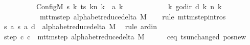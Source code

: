 \begin{isabellebody}
\ \ \ \ \ \ \ \ \ \ Config\isactrlsub M\ {\isacharquery}{\kern0pt}s{\isacharprime}{\kern0pt}\ {\isacharparenleft}{\kern0pt}{\isasymlambda}k{\isachardot}{\kern0pt}\ {\isacharparenleft}{\kern0pt}ts\ k{\isacharparenright}{\kern0pt}{\isacharparenleft}{\kern0pt}n\ k\ {\isacharcolon}{\kern0pt}{\isacharequal}{\kern0pt}\ {\isacharquery}{\kern0pt}a\ k{\isacharparenright}{\kern0pt}{\isacharparenright}{\kern0pt}\isanewline
\ \ \ \ \ \ \ \ \ \ \ \ {\isacharparenleft}{\kern0pt}{\isasymlambda}k{\isachardot}{\kern0pt}\ go{\isacharunderscore}{\kern0pt}dir\ {\isacharparenleft}{\kern0pt}{\isacharquery}{\kern0pt}d\ k{\isacharparenright}{\kern0pt}\ {\isacharparenleft}{\kern0pt}n\ k{\isacharparenright}{\kern0pt}{\isacharparenright}{\kern0pt}{\isacharparenright}{\kern0pt}\isanewline
\ \ \ \ \ \ \ \ \ \ {\isasymin}\ mttm{\isacharunderscore}{\kern0pt}step\ {\isacharparenleft}{\kern0pt}alphabet{\isacharunderscore}{\kern0pt}reduce{\isacharunderscore}{\kern0pt}delta\ M{\isacharparenright}{\kern0pt}{\isachardoublequoteclose}\isanewline
\ \ \isamarkupfalse%
\ {\isacharparenleft}{\kern0pt}rule\ mttm{\isacharunderscore}{\kern0pt}step{\isachardot}{\kern0pt}intros{\isacharparenright}{\kern0pt}\isanewline
\ \ \ \ \isamarkupfalse%
\ {\isachardoublequoteopen}{\isacharparenleft}{\kern0pt}{\isacharquery}{\kern0pt}s{\isacharcomma}{\kern0pt}\ {\isacharquery}{\kern0pt}a{\isacharcomma}{\kern0pt}\ {\isacharquery}{\kern0pt}s{\isacharprime}{\kern0pt}{\isacharcomma}{\kern0pt}\ {\isacharquery}{\kern0pt}a{\isacharcomma}{\kern0pt}\ {\isacharquery}{\kern0pt}d{\isacharparenright}{\kern0pt}\ {\isasymin}\ alphabet{\isacharunderscore}{\kern0pt}reduce{\isacharunderscore}{\kern0pt}delta\ M{\isachardoublequoteclose}\ \isamarkupfalse%
\ {\isacharparenleft}{\kern0pt}rule\ ard{\isacharunderscore}{\kern0pt}in{\isacharparenright}{\kern0pt}\isanewline
\ \ \isamarkupfalse%
\isanewline
\ \ \isamarkupfalse%
\ step{\isacharcolon}{\kern0pt}\ {\isachardoublequoteopen}{\isacharparenleft}{\kern0pt}c{\isacharprime}{\kern0pt}{\isacharcomma}{\kern0pt}\ {\isacharquery}{\kern0pt}c{\isacharprime}{\kern0pt}{\isacharprime}{\kern0pt}{\isacharparenright}{\kern0pt}\ {\isasymin}\ mttm{\isacharunderscore}{\kern0pt}step\ {\isacharparenleft}{\kern0pt}alphabet{\isacharunderscore}{\kern0pt}reduce{\isacharunderscore}{\kern0pt}delta\ M{\isacharparenright}{\kern0pt}{\isachardoublequoteclose}\isanewline
\ \ \ \ \isamarkupfalse%
\ c{\isacharprime}{\kern0pt}{\isacharunderscore}{\kern0pt}eq\ ts{\isacharunderscore}{\kern0pt}unchanged\ pos{\isacharunderscore}{\kern0pt}new\ \isamarkupfalse%

\end{isabellebody}
